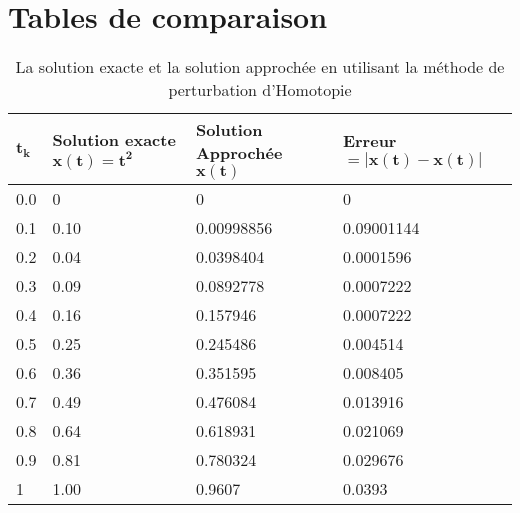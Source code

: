 \chapter{Tables de comparaison}
\vspace{-1 cm}
\begin{table}[H]\label{tab:1}
\caption {La solution exacte et la solution approchée en utilisant la méthode de perturbation d'Homotopie} 
\begin{tabular*}{\textwidth}{llll}
$\mathbf{t_k}$ & \textbf{Solution exacte} $\mathbf{x(t)=t^2}$ & \textbf{Solution Approchée} $\mathbf{x(t)}$ & \textbf{Erreur} $\mathbf{= |x(t)-x(t)|}$    \\ 
\hline
0.0   & 0    & 0          & 0                 \\
0.1   & 0.10 & 0.00998856 & 0.09001144 \\
0.2   & 0.04 & 0.0398404  & 0.0001596  \\
0.3   & 0.09 & 0.0892778  & 0.0007222 \\
0.4   & 0.16 & 0.157946   & 0.0007222 \\
0.5   & 0.25 & 0.245486   & 0.004514 \\
0.6   & 0.36 & 0.351595   & 0.008405 \\
0.7   & 0.49 & 0.476084   & 0.013916  \\
0.8   & 0.64 & 0.618931   & 0.021069 \\
0.9   & 0.81 & 0.780324   & 0.029676 \\
1     & 1.00 & 0.9607     & 0.0393 \\
\hline
\end{tabular*}
\end{table}

